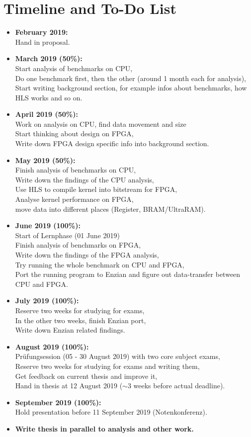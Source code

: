 \documentclass[12pt]{article}
\begin{document}
\section*{Timeline and To-Do List}
\begin{itemize}
\item \textbf{February 2019:}\\
Hand in proposal.
\item \textbf{March 2019 (50\%):}\\
Start analysis of benchmarks on CPU,\\
Do one benchmark first, then the other (around 1 month each for analysis),\\
Start writing background section, for example infos about benchmarks, how HLS works and so on.
\item \textbf{April 2019 (50\%):}\\
Work on analysis on CPU, find data movement and size\\
Start thinking about design on FPGA,\\
Write down FPGA design specific info into background section.
\item \textbf{May 2019 (50\%):}\\
Finish analysis of benchmarks on CPU,\\
Write down the findings of the CPU analysis,\\
Use HLS to compile kernel into bitstream for FPGA,\\
Analyse kernel performance on FPGA,\\
move data into different places (Register, BRAM/UltraRAM).
\item \textbf{June 2019 (100\%):}\\ 
Start of Lernphase (01 June 2019)\\
Finish analysis of benchmarks on FPGA,\\
Write down the findings of the FPGA analysis,\\
Try running the whole benchmark on CPU and FPGA,\\
Port the running program to Enzian and figure out data-transfer between CPU and FPGA.
\item \textbf{July 2019 (100\%):}\\
Reserve two weeks for studying for exams,\\
In the other two weeks, finish Enzian port,\\
Write down Enzian related findings.
\item \textbf{August 2019 (100\%):}\\
Prüfungsession (05 - 30 August 2019) with two core subject exams,\\
Reserve two weeks for studying for exams and writing them,\\
Get feedback on current thesis and improve it,\\
Hand in thesis at 12 August 2019 ($\sim$3 weeks before actual deadline).
\item \textbf{September 2019 (100\%):}\\
Hold presentation before 11 September 2019 (Notenkonferenz).
\item \textbf{Write thesis in parallel to analysis and other work.}
\end{itemize}
\end{document}
